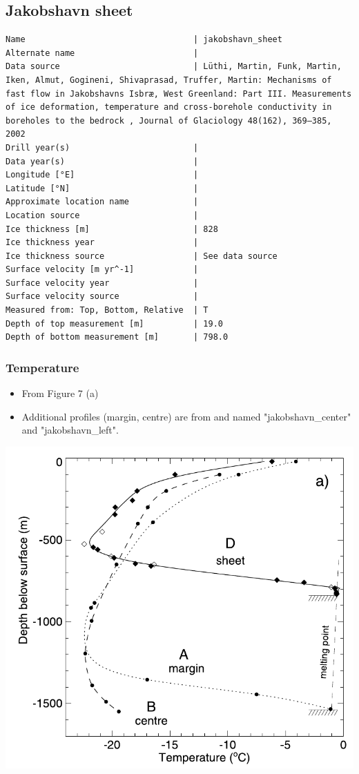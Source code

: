 \documentclass[article,a4paper,times,11pt,twoside]{article}
\begin{document}
\subsection{Jakobshavn sheet}
\label{sec:org9077eaa}
\begin{verbatim}
Name                                  | jakobshavn_sheet
Alternate name                        | 
Data source                           | Lüthi, Martin, Funk, Martin, Iken, Almut, Gogineni, Shivaprasad, Truffer, Martin: Mechanisms of fast flow in Jakobshavns Isbræ, West Greenland: Part III. Measurements of ice deformation, temperature and cross-borehole conductivity in boreholes to the bedrock , Journal of Glaciology 48(162), 369–385, 2002 
Drill year(s)                         | 
Data year(s)                          | 
Longitude [°E]                        | 
Latitude [°N]                         | 
Approximate location name             | 
Location source                       | 
Ice thickness [m]                     | 828
Ice thickness year                    | 
Ice thickness source                  | See data source
Surface velocity [m yr^-1]            | 
Surface velocity year                 | 
Surface velocity source               | 
Measured from: Top, Bottom, Relative  | T
Depth of top measurement [m]          | 19.0
Depth of bottom measurement [m]       | 798.0
\end{verbatim}

\subsubsection{Temperature}
\label{sec:org02a64aa}

\begin{itemize}
\item From \textcite{luthi_2002} Figure 7 (a)
\item Additional profiles (margin, centre) are from \textcite{iken_1993} and named "jakobshavn\_center" and "jakobshavn\_left".
\end{itemize}
\begin{center}
\includegraphics[width=.9\linewidth]{jakobshavn_sheet/luthi_2002_fig7.png}
\end{center}
\end{document}
